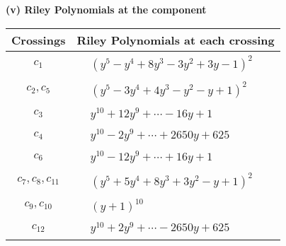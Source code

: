 \documentclass[1p]{elsarticle_modified}
\theoremstyle{definition}
\begin{document}
\newpage\renewcommand{\arraystretch}{1}
\flushleft \textbf{(v) Riley Polynomials at the component}\newline \\
\begin{tabular}{m{50pt}|m{274pt}}
Crossings & \hspace{64pt}Riley Polynomials at each crossing \\
\hline $$\begin{aligned}c_{1}\end{aligned}$$&$\begin{aligned}
&(y^5- y^4+8 y^3-3 y^2+3 y-1)^2
\end{aligned}$\\
\hline $$\begin{aligned}c_{2},c_{5}\end{aligned}$$&$\begin{aligned}
&(y^5-3 y^4+4 y^3- y^2- y+1)^2
\end{aligned}$\\
\hline $$\begin{aligned}c_{3}\end{aligned}$$&$\begin{aligned}
&y^{10}+12 y^9+\cdots-16 y+1
\end{aligned}$\\
\hline $$\begin{aligned}c_{4}\end{aligned}$$&$\begin{aligned}
&y^{10}-2 y^9+\cdots+2650 y+625
\end{aligned}$\\
\hline $$\begin{aligned}c_{6}\end{aligned}$$&$\begin{aligned}
&y^{10}-12 y^9+\cdots+16 y+1
\end{aligned}$\\
\hline $$\begin{aligned}c_{7},c_{8},c_{11}\end{aligned}$$&$\begin{aligned}
&(y^5+5 y^4+8 y^3+3 y^2- y+1)^2
\end{aligned}$\\
\hline $$\begin{aligned}c_{9},c_{10}\end{aligned}$$&$\begin{aligned}
&(y+1)^{10}
\end{aligned}$\\
\hline $$\begin{aligned}c_{12}\end{aligned}$$&$\begin{aligned}
&y^{10}+2 y^9+\cdots-2650 y+625
\end{aligned}$\\
\hline
\end{tabular}\\~\\
\end{document}
